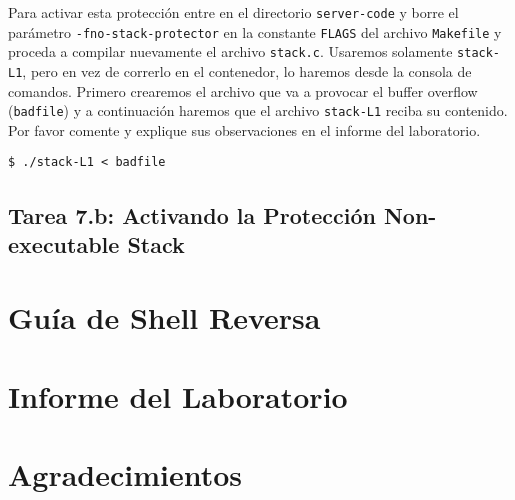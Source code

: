 Para activar esta protección entre en el directorio \texttt{server-code} y borre el parámetro \texttt{-fno-stack-protector} en la constante \texttt{FLAGS} del archivo \texttt{Makefile} y proceda a compilar nuevamente el archivo \texttt{stack.c}.
Usaremos solamente \texttt{stack-L1}, pero en vez de correrlo en el contenedor, lo haremos desde la consola de comandos. Primero crearemos el archivo que va a provocar el buffer overflow (\texttt{badfile}) y a continuación haremos que el archivo \texttt{stack-L1} reciba su contenido. Por favor comente y explique sus observaciones en el informe del laboratorio.

\begin{lstlisting}
$ ./stack-L1 < badfile 
\end{lstlisting}
 

\subsection{Tarea 7.b: Activando la Protección Non-executable Stack}




\section{Guía de Shell Reversa} 
\label{sec:guildelines}






\section{Informe del Laboratorio}



\section{Agradecimientos}




